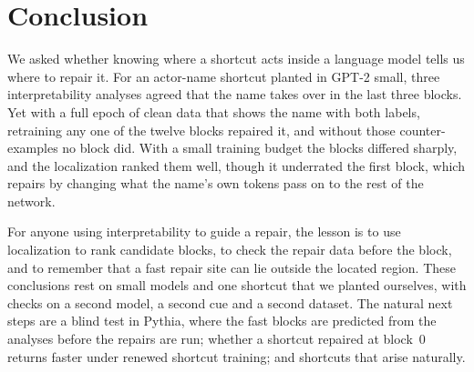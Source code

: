 \section{Conclusion}
\label{sec:conclusion}
We asked whether knowing where a shortcut acts inside a language model tells us where to repair it. For an actor-name
shortcut planted in GPT-2 small, three interpretability analyses agreed that the name takes over in the last three
blocks. Yet with a full epoch of clean data that shows the name with both labels, retraining any one of the twelve
blocks repaired it, and without those counter-examples no block did. With a small training budget the blocks differed
sharply, and the localization ranked them well, though it underrated the first block, which repairs by changing what
the name's own tokens pass on to the rest of the network.

For anyone using interpretability to guide a repair, the lesson is to use localization to rank candidate blocks, to
check the repair data before the block, and to remember that a fast repair site can lie outside the located region.
These conclusions rest on small models and one shortcut that we planted ourselves, with checks on a second model, a
second cue and a second dataset. The natural next steps are a blind test in Pythia, where the fast blocks are
predicted from the analyses before the repairs are run; whether a shortcut repaired at block~0 returns faster under
renewed shortcut training; and shortcuts that arise naturally.

